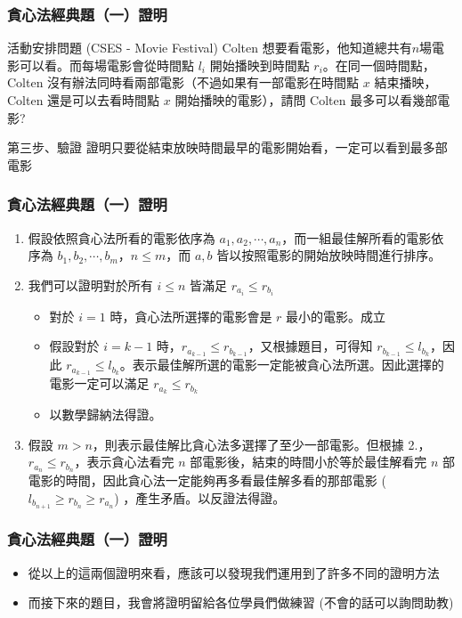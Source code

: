 \documentclass[aspectratio=169]{beamer}
\begin{document}
\begin{frame}
\frametitle{貪心法經典題（一）證明}
    \begin{block}{活動安排問題 (CSES - Movie Festival)}
        Colten 想要看電影，他知道總共有$n$場電影可以看。而每場電影會從時間點 $l_i$ 開始播映到時間點 $r_i$。在同一個時間點，Colten 沒有辦法同時看兩部電影（不過如果有一部電影在時間點 $x$ 結束播映，Colten 還是可以去看時間點 $x$ 開始播映的電影），請問 Colten 最多可以看幾部電影?
    \end{block}
    \begin{alertblock}{第三步、驗證}
        證明只要從結束放映時間最早的電影開始看，一定可以看到最多部電影
    \end{alertblock}
\end{frame}

\begin{frame}
\frametitle{貪心法經典題（一）證明}
    \begin{enumerate}
        \item<1-> 假設依照貪心法所看的電影依序為 $a_1,a_2,\cdots,a_n$，而一組最佳解所看的電影依序為 $b_1,b_2,\cdots,b_m$，$n \le m$，而 $a,b$ 皆以按照電影的開始放映時間進行排序。
        \item<2-> 我們可以證明對於所有 $i \le n$ 皆滿足 $r_{a_i} \le r_{b_i}$
            \begin{itemize}
                \item 對於 $i=1$ 時，貪心法所選擇的電影會是 $r$ 最小的電影。成立
                \item 假設對於 $i=k-1$ 時，$r_{a_{k-1}} \le r_{b_{k-1}}$，又根據題目，可得知 $r_{b_{k-1}} \le l_{b_k}$，因此 $r_{a_{k-1}} \le l_{b_k}$。表示最佳解所選的電影一定能被貪心法所選。因此選擇的電影一定可以滿足 $r_{a_k} \le r_{b_k}$
                \item 以數學歸納法得證。
            \end{itemize}
        \item<3-> 假設 $m > n$，則表示最佳解比貪心法多選擇了至少一部電影。但根據 2.，$r_{a_n} \le r_{b_n}$，表示貪心法看完 $n$ 部電影後，結束的時間小於等於最佳解看完 $n$ 部電影的時間，因此貪心法一定能夠再多看最佳解多看的那部電影 ($l_{b_{n+1}} \ge r_{b_n} \ge r_{a_n}$) ，產生矛盾。以反證法得證。
    \end{enumerate}
\end{frame}

\begin{frame}
\frametitle{貪心法經典題（一）證明}
    \begin{itemize}
        \item 從以上的這兩個證明來看，應該可以發現我們運用到了許多不同的證明方法
        \item 而接下來的題目，我會將證明留給各位學員們做練習 (不會的話可以詢問助教)
    \end{itemize}
\end{frame}
\end{document}
